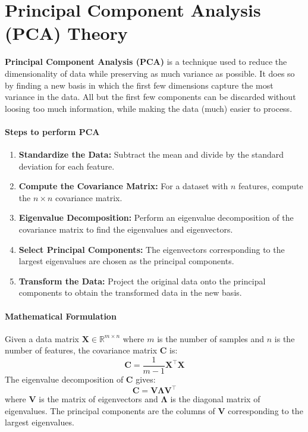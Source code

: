 \documentclass[]{article}
\begin{document}
	\section{Principal Component Analysis (PCA) Theory}
	\textbf{Principal Component Analysis (PCA)} is a technique used to reduce the dimensionality of data while preserving as much variance as possible.
	It does so by finding a new basis in which the first few dimensions capture the most variance in the data.
	All but the first few components can be discarded without loosing too much information, while making the data (much) easier to process.
	
	\paragraph{Steps to perform PCA}
	\begin{enumerate}
		\item \textbf{Standardize the Data:}
		Subtract the mean and divide by the standard deviation for each feature.
		\item \textbf{Compute the Covariance Matrix:}
		For a dataset with $n$ features, compute the $n \times n$ covariance matrix.
		\item \textbf{Eigenvalue Decomposition:}
		Perform an eigenvalue decomposition of the covariance matrix to find the eigenvalues and eigenvectors.
		\item \textbf{Select Principal Components:}
		The eigenvectors corresponding to the largest eigenvalues are chosen as the principal components.
		\item \textbf{Transform the Data:}
		Project the original data onto the principal components to obtain the transformed data in the new basis.
	\end{enumerate}
	
	\paragraph{Mathematical Formulation}
	Given a data matrix $\mathbf{X} \in \mathbb{R}^{m \times n}$ where $m$ is the number of samples and $n$ is the number of features, the covariance matrix $\mathbf{C}$ is:
	$$
	\mathbf{C} = \frac{1}{m-1} \mathbf{X}^\top \mathbf{X}
	$$
	The eigenvalue decomposition of $\mathbf{C}$ gives:
	$$
	\mathbf{C} = \mathbf{V} \mathbf{\Lambda} \mathbf{V}^\top
	$$
	where $\mathbf{V}$ is the matrix of eigenvectors and $\mathbf{\Lambda}$ is the diagonal matrix of eigenvalues.
	The principal components are the columns of $\mathbf{V}$ corresponding to the largest eigenvalues.
	
	
	
	
\end{document}
